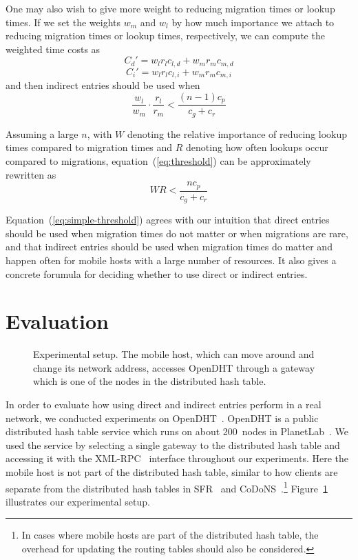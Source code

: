 \documentclass{article}
\begin{document}
One may also wish to give more weight to reducing migration times or
lookup times.  If we set the weights $w_m$ and $w_l$ by how much
importance we attach to reducing migration times or lookup times,
respectively, we can compute the weighted time costs as
\[C_d' = w_lr_lc_{l,d} + w_mr_mc_{m,d}\]
\[C_i' = w_lr_lc_{l,i} + w_mr_mc_{m,i}\]
and then indirect entries should be used when
\begin{equation}
  \label{eq:threshold}
  \frac{w_l}{w_m} \cdot \frac{r_l}{r_m} < \frac{(n-1)c_p}{c_g+c_r}  
\end{equation}

Assuming a large $n$, with $W$ denoting the relative importance of
reducing lookup times compared to migration times and $R$ denoting how
often lookups occur compared to migrations,
equation~(\ref{eq:threshold}) can be approximately rewritten as
\begin{equation}
  \label{eq:simple-threshold}
  WR < \frac{n c_p}{c_g + c_r}
\end{equation}

Equation~(\ref{eq:simple-threshold}) agrees with our intuition that direct
entries should be used when migration times do not matter or when
migrations are rare, and that indirect entries should be used when
migration times do matter and happen often for mobile hosts with a
large number of resources.  It also gives a concrete forumula for
deciding whether to use direct or indirect entries.


\section{Evaluation}
\label{sec:eval}

\begin{figure}
  \centering
  \caption{Experimental setup.  The mobile host, which can move around
    and change its network address, accesses OpenDHT through a gateway
    which is one of the nodes in the distributed hash table.}
  \label{fig:setup}
\end{figure}

In order to evaluate how using direct and indirect entries perform in
a real network, we conducted experiments on
OpenDHT~\cite{rhea:sigcomm2005}.  OpenDHT is a public distributed hash
table service which runs on about 200~nodes in
PlanetLab~\cite{fiuczynski:sigops2006}.  We used the service by
selecting a single gateway to the distributed hash table and accessing
it with the XML-RPC~\cite{xmlrpc} interface throughout our
experiments.  Here the mobile host is not part of the distributed hash
table, similar to how clients are separate from the distributed hash
tables in SFR~\cite{walfish:nsdi2004} and
CoDoNS~\cite{ramasubramanian:sigcomm2004}.\footnote{In cases where
  mobile hosts are part of the distributed hash table, the overhead
  for updating the routing tables should also be considered.}
Figure~\ref{fig:setup} illustrates our experimental setup.
\end{document}
